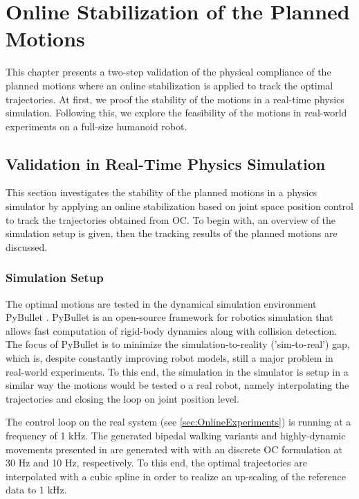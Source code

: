 
\chapter{Online Stabilization of the Planned Motions}\label{c6}
This chapter presents a two-step validation of the physical compliance of the planned motions where an online stabilization is applied to track the optimal trajectories. At first, we proof the stability of the motions in a real-time physics simulation. Following this, we explore the feasibility of the motions in real-world experiments on a full-size humanoid robot.    

\section{Validation in Real-Time Physics Simulation}\label{sec:OnlineSimulation}
This section investigates the stability of the planned motions in a physics simulator by applying an online stabilization based on joint space position control to track the trajectories obtained from \gls{OC}. To begin with, an overview of the simulation setup is given, then the tracking results of the planned motions are discussed. 

\subsection{Simulation Setup}
The optimal motions are tested in the dynamical simulation environment PyBullet \cite{coumans2016pybullet}. PyBullet is an open-source framework for robotics simulation that allows fast computation of rigid-body dynamics along with collision detection. The focus of PyBullet is to minimize the simulation-to-reality ('sim-to-real') gap, which is, despite constantly improving robot models, still a major problem in real-world experiments. To this end, the simulation in the simulator is setup in a similar way the motions would be tested o a real robot, namely interpolating the trajectories and closing the loop on joint position level.

The control loop on the real system (see \cref{sec:OnlineExperiments}) is running at a frequency of 1 kHz. The generated bipedal walking variants and highly-dynamic movements presented in  are generated with with an discrete \gls{OC} formulation at 30 Hz and 10 Hz, respectively. To this end, the optimal trajectories are interpolated with a cubic spline in order to realize an up-scaling of the reference data to 1 kHz.  

